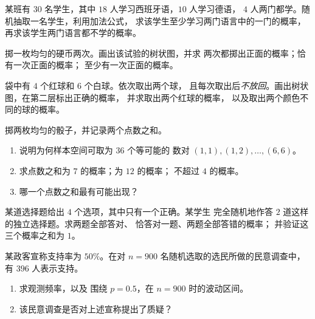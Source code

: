 \begin{exercise}[$\star$]\label{exo:g10:proba:3}
某班有 $30$ 名学生，其中 $18$ 人学习西班牙语，$10$ 人学习德语，
$4$ 人两门都学。随机抽取一名学生，利用加法公式，
求该学生至少学习两门语言中的一门的概率，
再求该学生两门语言都不学的概率。
\end{exercise}

\begin{exercise}[$\star$]\label{exo:g10:proba:4}
掷一枚均匀的硬币两次。画出该试验的树状图，并求
两次都掷出正面的概率；恰有一次正面的概率；
至少有一次正面的概率。
\end{exercise}

\begin{exercise}[$\star\star$]\label{exo:g10:proba:5}
袋中有 $4$ 个红球和 $6$ 个白球。依次取出两个球，
且每次取出后\emph{不放回}。画出树状图，在第二层标出正确的概率，
并求取出两个红球的概率，
以及取出两个颜色不同的球的概率。
\end{exercise}

\begin{exercise}[$\star\star$]\label{exo:g10:proba:6}
掷两枚均匀的骰子，并记录两个点数之和。
\begin{enumerate}
  \item 说明为何样本空间可取为 $36$ 个等可能的
        数对 $(1,1), (1,2), \dots, (6,6)$。
  \item 求点数之和为 $7$ 的概率；为 $12$ 的概率；
        不超过 $4$ 的概率。
  \item 哪一个点数之和最有可能出现？
\end{enumerate}
\end{exercise}

\begin{exercise}[$\star\star$]\label{exo:g10:proba:7}
某道选择题给出 $4$ 个选项，其中只有一个正确。某学生
完全随机地作答 $2$ 道这样的独立选择题。求两题全部答对、
恰答对一题、两题全部答错的概率；
并验证这三个概率之和为 $1$。
\end{exercise}

\begin{exercise}[$\star\star$]\label{exo:g10:proba:8}
某政客宣称支持率为 $50\%$。在对 $n = 900$ 名随机选取的选民所做的民意调查中，
有 $396$ 人表示支持。
\begin{enumerate}
  \item 求观测频率，以及
        围绕 $p = 0.5$，在 $n = 900$ 时的波动区间。
  \item 该民意调查是否对上述宣称提出了质疑？
\end{enumerate}
\end{exercise}

